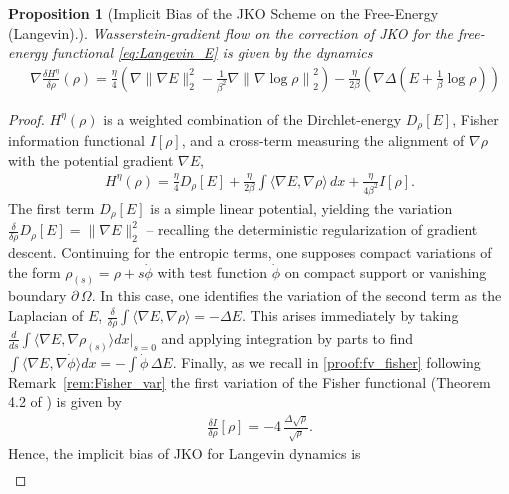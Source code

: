 \documentclass[reqno,11pt,letterpaper]{amsart}
\theoremstyle{plain}
\newtheorem{prop}{Proposition}
\theoremstyle{definition}
\theoremstyle{remark}
\begin{document}
\begin{prop}[Implicit Bias of the JKO Scheme on the Free-Energy (Langevin).]
    Wasserstein-gradient flow on the correction of JKO for the free-energy functional \eqref{eq:Langevin_E} is given by the dynamics
    \begin{align}\label{eq:WGF_H_Langevin}
    &\nabla \frac{\delta  H^{\eta}}{\delta \rho}(\rho) = \frac{\eta}{4} \left( \nabla \lVert \nabla E \rVert_{2}^{2} -   \frac{1}{\beta^{2}} \nabla \left\lVert \nabla \log \rho \right\rVert_{2}^{2} \right)
     -\frac{\eta}{2\beta} \left( 
    \nabla \Delta ( E + \frac{1}{\beta} \log \rho)
    \right)
\end{align}
\end{prop}
\begin{proof}
$H^{\eta}(\rho)$ is a weighted combination of the Dirchlet-energy $D_{\rho}[E]$, Fisher information functional $I[\rho]$, and a cross-term measuring the alignment of $\nabla \rho$ with the potential gradient $\nabla E$,
\begin{align}
    H^{\eta}(\rho)= \frac{\eta}{4}D_{\rho}[E] + \frac{\eta}{2 \beta} \int \langle \nabla E , \nabla \rho\rangle\, dx + \frac{\eta}{4 \beta^{2}} I[\rho].
\end{align}
The first term $D_{\rho}[E]$ is a simple linear potential, yielding the variation $\frac{\delta}{\delta \rho} D_{\rho}[E] = \lVert \nabla E \rVert_{2}^{2}$ -- recalling the deterministic regularization of gradient descent. Continuing for the entropic terms, one supposes compact variations of the form $\rho_{(s)} = \rho + s \dot\phi$ with test function $\dot\phi$ on compact support or vanishing boundary $\partial \,\Omega$. In this case, one identifies the variation of the second term as the Laplacian of $E$, $\frac{\delta}{\delta \rho}\int \langle \nabla E , \nabla \rho\rangle = - \Delta E$. This arises immediately by taking $\frac{d}{ds} \int \langle \nabla E, \nabla \rho_{(s)} \rangle dx |_{s=0}$ and applying integration by parts to find $\int \langle \nabla E, \nabla \dot\phi \rangle dx = - \int \dot\phi \,\Delta E$. Finally, as we recall in \ref{proof:fv_fisher} following Remark~\ref{rem:Fisher_var} the first variation of the Fisher functional (Theorem 4.2 of \cite{Gianazza2008}) is given by
\begin{align}\label{eq:fish_FV}
    \frac{\delta I}{\delta \rho} [\rho] = -4\, \frac{\Delta \sqrt{ \rho}}{\sqrt{\rho}}. 
\end{align}
Hence, the implicit bias of JKO for Langevin dynamics is 
\begin{align*}

\end{align*}
\end{proof}
\end{document}
